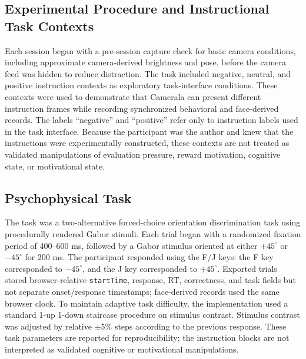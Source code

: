 \documentclass[dvipdfmx]{ehis}
\begin{document}
\subsection{Experimental Procedure and Instructional Task Contexts}
Each session began with a pre-session capture check for basic camera conditions, including approximate camera-derived brightness and pose, before the camera feed was hidden to reduce distraction.
The task included negative, neutral, and positive instruction contexts as exploratory task-interface conditions.
These contexts were used to demonstrate that Camerala can present different instruction frames while recording synchronized behavioral and face-derived records.
The labels ``negative'' and ``positive'' refer only to instruction labels used in the task interface.
Because the participant was the author and knew that the instructions were experimentally constructed, these contexts are not treated as validated manipulations of evaluation pressure, reward motivation, cognitive state, or motivational state.

\subsection{Psychophysical Task}
The task was a two-alternative forced-choice orientation discrimination task using procedurally rendered Gabor stimuli.
Each trial began with a randomized fixation period of 400--600 ms, followed by a Gabor stimulus oriented at either $+45^\circ$ or $-45^\circ$ for 200 ms.
The participant responded using the F/J keys: the F key corresponded to $-45^\circ$, and the J key corresponded to $+45^\circ$.
Exported trials stored browser-relative \texttt{startTime}, response, RT, correctness, and task fields but not separate onset/response timestamps; face-derived records used the same browser clock.
To maintain adaptive task difficulty, the implementation used a standard 1-up 1-down staircase procedure on stimulus contrast.
Stimulus contrast was adjusted by relative $\pm 5\%$ steps according to the previous response.
These task parameters are reported for reproducibility; the instruction blocks are not interpreted as validated cognitive or motivational manipulations.
\end{document}
